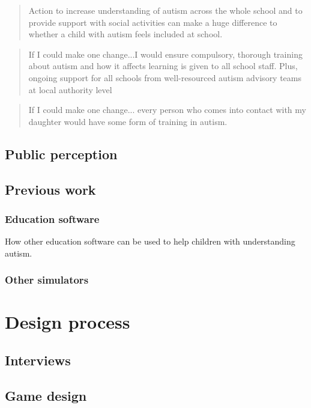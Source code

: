\documentclass[11pt]{report}
\begin{document}
\begin{quote}
Action to increase understanding of autism across the whole school and to provide support with social activities can make a huge difference to whether a child with autism feels included at school.\cite{nasschool}
\end{quote}

\begin{quote}
If I could make one change...I would ensure compulsory, thorough training about autism and how it affects learning is given to all school staff. Plus, ongoing support for all schools from well-resourced autism advisory teams at local authority level\cite{nasschool}
\end{quote}

\begin{quote}
If I could make one change... every person who comes into contact with my daughter would have some form of training in autism.\cite{nasschool}
\end{quote}


\section{Public perception}


\section{Previous work}

\subsection{Education software}
How other education software can be used to help children with understanding autism. 
\subsection{Other simulators}

\chapter{Design process}
\section{Interviews}

\section{Game design}
\end{document}
